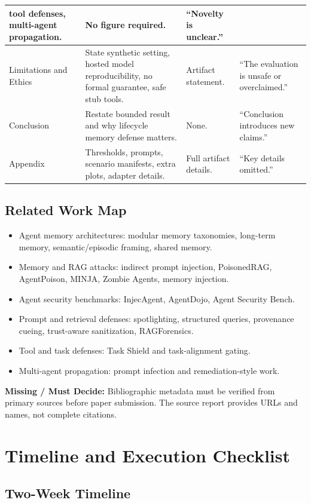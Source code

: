 \documentclass[11pt,oneside]{report}
\newcommand{\missing}{\textbf{Missing / Must Decide: }}
\begin{document}
\begin{longtable}{|L{0.15\textwidth}|L{0.25\textwidth}|L{0.25\textwidth}|L{0.25\textwidth}|}
tool defenses, multi-agent propagation. & No figure required. & ``Novelty is unclear.'' \\
\hline
Limitations and Ethics & State synthetic setting, hosted model reproducibility, no formal guarantee,
safe stub tools. & Artifact statement. & ``The evaluation is unsafe or overclaimed.'' \\
\hline
Conclusion & Restate bounded result and why lifecycle memory defense matters. & None. & ``Conclusion
introduces new claims.'' \\
\hline
Appendix & Thresholds, prompts, scenario manifests, extra plots, adapter details. & Full artifact
details. & ``Key details omitted.'' \\
\hline
\end{longtable}

\section{Related Work Map}

\begin{itemize}
  \item Agent memory architectures: modular memory taxonomies, long-term memory, semantic/episodic
        framing, shared memory.
  \item Memory and RAG attacks: indirect prompt injection, PoisonedRAG, AgentPoison, MINJA, Zombie
        Agents, memory injection.
  \item Agent security benchmarks: InjecAgent, AgentDojo, Agent Security Bench.
  \item Prompt and retrieval defenses: spotlighting, structured queries, provenance cueing,
        trust-aware sanitization, RAGForensics.
  \item Tool and task defenses: Task Shield and task-alignment gating.
  \item Multi-agent propagation: prompt infection and remediation-style work.
\end{itemize}

\missing{} Bibliographic metadata must be verified from primary sources before paper submission.
The source report provides URLs and names, not complete citations.

\chapter{Timeline and Execution Checklist}

\section{Two-Week Timeline}
\end{document}
